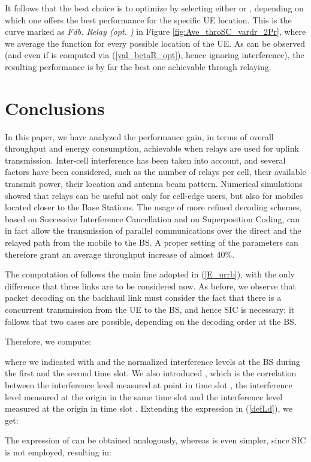 \documentclass[12pt, letterpaper, onecolumn, draftcls]{IEEEtran}
\begin{document}
It follows that the best choice is to optimize  by selecting either  or , depending on which one offers the best performance for the specific UE location. This is the curve marked as \textit{Fdb. Relay (opt. )} in Figure \ref{fig:Ave_throSC_vardr_2Pr}, where we average the function  for every possible location  of the UE. As can be observed (and even if  is computed via (\ref{val_betaR_opt}), hence ignoring interference), the resulting performance is by far the best one achievable through relaying.

\section{Conclusions}
\label{concl}
In this paper, we have analyzed the performance gain, in terms of overall throughput and energy consumption, achievable when relays are used for uplink transmission. Inter-cell interference has been taken into account, and several factors have been considered, such as the number of relays per cell, their available transmit power, their location and antenna beam pattern. Numerical simulations showed that relays can be useful not only for cell-edge users, but also for mobiles located closer to the Base Stations.
The usage of more refined decoding schemes, based on Successive Interference Cancellation and on Superposition Coding, can in fact allow the transmission of parallel communications over the direct and the relayed path from the mobile to the BS. A proper setting of the parameters can therefore grant an average throughput increase of almost 40\%.

\appendix


The computation of  follows the main line adopted in (\ref{E_urrb}), with the only difference that three links are to be considered now. As before, we observe that packet decoding on the backhaul link must consider the fact that there is a concurrent transmission from the UE to the BS, and hence SIC is necessary; it follows that two cases are possible, depending on the decoding order at the BS.

Therefore, we compute:

where we indicated with  and  the normalized interference levels at the BS during the first and the second time slot. We also introduced , which is the correlation between the interference level  measured at point  in time slot , the interference level  measured at the origin in the same time slot and the interference level  measured at the origin in time slot .
Extending the expression in (\ref{defLd}), we get:


The expression of  can be obtained analogously, whereas  is even simpler, since SIC is not employed, resulting in:





\end{document}
